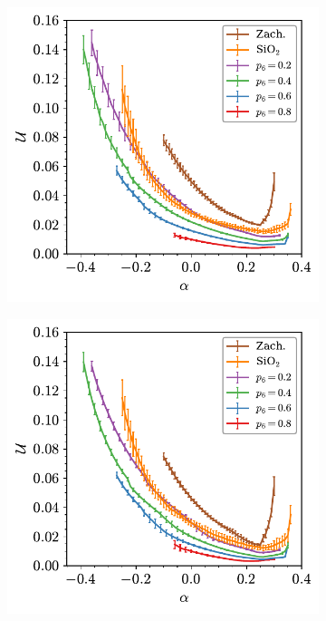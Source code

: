 \begin{figure}[bt]
     \centering
     
     \begin{subfigure}[b]{0.45\textwidth}
         \centering
         \includegraphics[width=\textwidth]{./figures/targeted_opt/topt_u_graph.pdf}
         \caption{}%
         \label{fig:toptenergy1}
     \end{subfigure}
     \hfill
	\begin{subfigure}[b]{0.45\textwidth}
         \centering
         \includegraphics[width=\textwidth]{./figures/targeted_opt/topt_u_dual.pdf}
         \caption{}%
         \label{fig:toptenergy2}
     \end{subfigure}


\end{figure}
